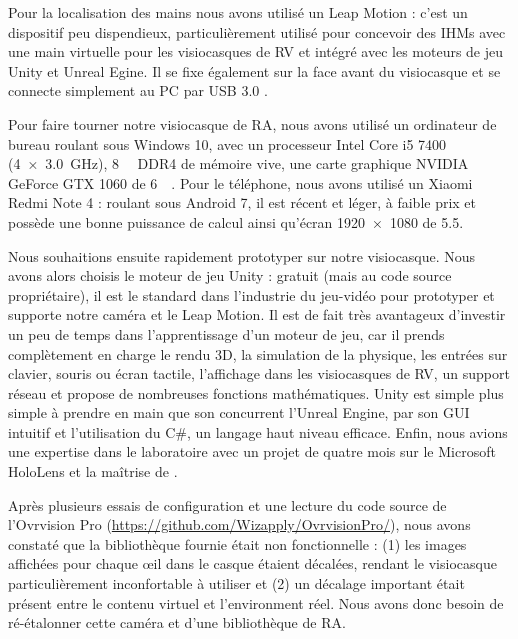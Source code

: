 
Pour la localisation des mains nous avons utilisé un Leap Motion : c'est un dispositif peu dispendieux, particulièrement utilisé pour concevoir des IHMs avec une main virtuelle pour les visiocasques de RV et intégré avec les moteurs de jeu Unity et Unreal Egine. Il se fixe également sur la face avant du visiocasque et se connecte simplement au PC par USB 3.0 .

Pour faire tourner notre visiocasque de RA, nous avons utilisé un ordinateur de bureau roulant sous Windows 10, avec un processeur Intel Core i5 7400 (\SI[product-units = single]{4x3.0}{\GHz}), \SI{8}{\giga\byte} DDR4 de mémoire vive, une carte graphique NVIDIA GeForce GTX 1060 de \SI{6}{\giga\byte}. Pour le téléphone, nous avons utilisé un Xiaomi Redmi Note 4 : roulant sous Android 7, il est récent et léger, à faible prix et possède une bonne puissance de calcul ainsi qu'écran \SI{1920x1080}{\px} de \SI{5.5}{\inch}.

Nous souhaitions ensuite rapidement prototyper sur notre visiocasque. Nous avons alors choisis le moteur de jeu Unity : gratuit (mais au code source propriétaire), il est le standard dans l'industrie du jeu-vidéo pour prototyper et supporte notre caméra et le Leap Motion. Il est de fait très avantageux d'investir un peu de temps dans l'apprentissage d'un moteur de jeu, car il prends complètement en charge le rendu 3D, la simulation de la physique, les entrées sur clavier, souris ou écran tactile, l'affichage dans les visiocasques de RV, un support réseau et propose de nombreuses fonctions mathématiques. Unity est simple plus simple à prendre en main que son concurrent l'Unreal Engine, par son GUI intuitif et l'utilisation du C\#, un langage haut niveau efficace. Enfin, nous avions une expertise dans le laboratoire avec un projet de quatre mois sur le Microsoft HoloLens et la maîtrise de \cite{Millette2016}.

Après plusieurs essais de configuration et une lecture du code source de l'Ovrvision Pro (\url{https://github.com/Wizapply/OvrvisionPro/}), nous avons constaté que la bibliothèque fournie était non fonctionnelle : (1) les images affichées pour chaque \oe il dans le casque étaient décalées, rendant le visiocasque particulièrement inconfortable à utiliser et (2) un décalage important était présent entre le contenu virtuel et l'environment réel. Nous avons donc besoin de ré-étalonner cette caméra et d'une bibliothèque de RA.

